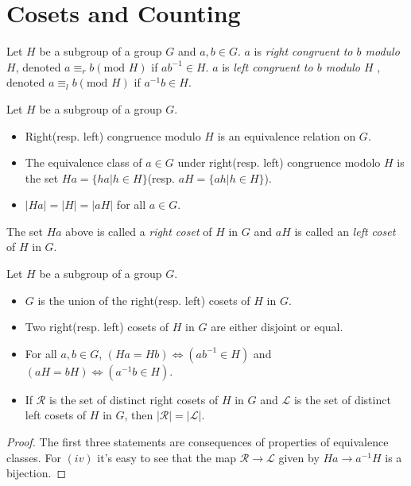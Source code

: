 \section{Cosets and Counting}
\begin{Definition}
	Let $ H $ be a subgroup of a group $ G $ and $ a,b \in G $. $ a $ is \textit{right congruent to $ b $ modulo $ H $}, denoted $ a \equiv_r b (\text{mod }H) $ if $ a b^{-1}\in H $. $ a $ is \textit{left congruent to $ b $ modulo $ H $ }, denoted $ a \equiv_l b (\text{mod }H) $ if $  a^{-1}b\in H $.
\end{Definition}
\begin{Theorem}
	Let $ H $ be a subgroup of a group $ G $.
	\begin{itemize}
		\item Right(resp. left) congruence modulo $ H $ is an equivalence relation on $ G $.
		\item The equivalence class of $ a \in G $ under right(resp. left) congruence modolo $ H $ is the set $ Ha = \{ha |h\in H \} $(resp. $ aH = \{ah |h\in H \} $).
		\item $ |Ha| = |H| = |aH| $ for all $ a \in G $.
	\end{itemize}
\end{Theorem}
\begin{Definition}
	The set $ Ha $ above is called a \textit{right coset} of $ H $ in $ G $ and $ aH $ is called an \textit{left coset} of $ H $ in $ G $.
\end{Definition}
\begin{Corollary}
	Let $ H $ be a subgroup of a group $ G $.
	\begin{itemize}
		\item  $ G $ is the union of the right(resp. left) cosets of $ H $ in $ G $.
		\item Two right(resp. left) cosets of $ H $ in $ G $ are either disjoint or equal.
		\item For all $ a,b\in G $, $ (Ha = Hb) \Leftrightarrow (a b^{-1}\in H)$ and $  (aH = bH) \Leftrightarrow ( a^{-1}b\in H) $.
		\item If $ \mathcal{R} $ is the set of distinct right cosets of $ H $ in $ G $ and $ \mathcal{L} $ is the set of distinct left cosets of $ H $ in $ G $, then $ |\mathcal{R}|=|\mathcal{L}| $.
	\end{itemize}
\end{Corollary}
\begin{proof}
	The first three statements are consequences of properties of equivalence classes. For $ (iv) $ it's easy to see that the map $ \mathcal{R}\to\mathcal{L} $ given by $ Ha \to a^{-1}H $ is a bijection.
\end{proof}
